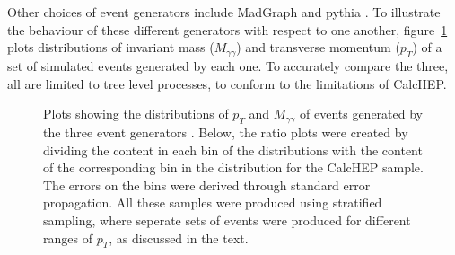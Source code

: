 Other choices of event generators include MadGraph \cite{madgraph5} and pythia \cite{pythia}. To illustrate the behaviour of these different generators with respect to one another, figure~\ref{evgen} plots distributions of invariant mass ($M_{\gamma\gamma}$) and transverse momentum ($p_T$) of a set of simulated events generated by each one. To accurately compare the three, all are limited to tree level processes, to conform to the limitations of CalcHEP.

\begin{figure}[htp]
\begin{minipage}[b]{.69\textwidth}
\begin{infilsf} \tiny
\hspace{-1ex}\makebox[0pt][l]{}
\end{infilsf}
\end{minipage}
\begin{minipage}[b]{.3\textwidth}

\phantom{p}
\end{minipage}
\begin{minipage}[b]{.69\textwidth}
\begin{infilsf} \tiny
\hspace{-1ex}\makebox[0pt][l]{}
\end{infilsf}
\end{minipage}
\begin{minipage}[b]{.3\textwidth}

\phantom{p}
\end{minipage}
\caption{Plots showing the distributions of $p_T$ and $M_{\gamma\gamma}$ of events generated by the three event generators \cite{calchep} \cite{pythia} \cite{madgraph5}. Below, the ratio plots were created by dividing the content in each bin of the distributions with the content of the corresponding bin in the distribution for the CalcHEP sample. The errors on the bins were derived through standard error propagation. All these samples were produced using stratified sampling, where seperate sets of events were produced for different ranges of $p_T$, as discussed in the text.
\label{evgen}}
\end{figure}

